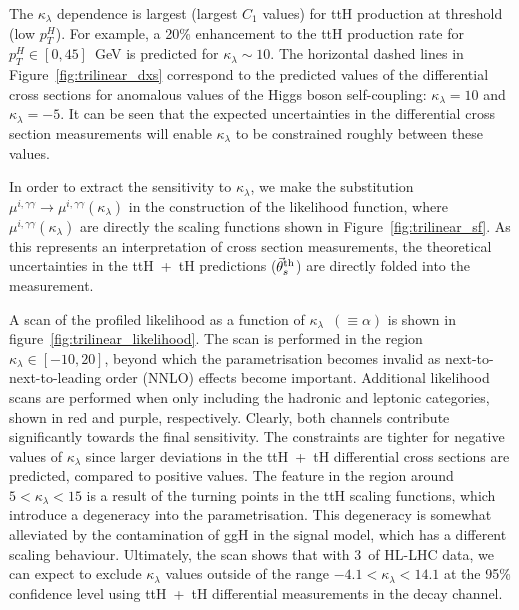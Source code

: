 The $\kappa_\lambda$ dependence is largest (largest $C_1$ values) for ttH production at threshold (low $p_T^H$). For example, a 20\% enhancement to the ttH production rate for $p_T^H\in[0,45]$~GeV is predicted for $\kappa_\lambda \sim 10$. The horizontal dashed lines in Figure~\ref{fig:trilinear_dxs} correspond to the predicted values of the differential cross sections for anomalous values of the Higgs boson self-coupling: $\kappa_\lambda=10$ and $\kappa_\lambda=-5$. It can be seen that the expected uncertainties in the differential cross section measurements will enable $\kappa_\lambda$ to be constrained roughly between these values.

In order to extract the sensitivity to $\kappa_\lambda$, we make the substitution $\mu^{i,\gamma\gamma}\rightarrow\mu^{i,\gamma\gamma}(\kappa_\lambda)$ in the construction of the likelihood function, where $\mu^{i,\gamma\gamma}(\kappa_\lambda)$ are directly the scaling functions shown in Figure~\ref{fig:trilinear_sf}. As this represents an interpretation of cross section measurements, the theoretical uncertainties in the ttH~+~tH predictions ($\vec{\theta}^{\rm{th}}_s$) are directly folded into the measurement.

A scan of the profiled likelihood as a function of $\kappa_\lambda$~$(\equiv\alpha)$ is shown in figure~\ref{fig:trilinear_likelihood}. The scan is performed in the region $\kappa_\lambda \in [-10,20]$, beyond which the parametrisation becomes invalid as next-to-next-to-leading order (NNLO) effects become important. Additional likelihood scans are performed when only including the hadronic and leptonic categories, shown in red and purple, respectively. Clearly, both channels contribute significantly towards the final sensitivity. The constraints are tighter for negative values of $\kappa_\lambda$ since larger deviations in the ttH~+~tH differential cross sections are predicted, compared to positive values. The feature in the region around $5<\kappa_\lambda<15$ is a result of the turning points in the ttH scaling functions, which introduce a degeneracy into the parametrisation. This degeneracy is somewhat alleviated by the contamination of ggH in the signal model, which has a different scaling behaviour. Ultimately, the scan shows that with 3~\abinv of HL-LHC data, we can expect to exclude $\kappa_\lambda$ values outside of the range $-4.1<\kappa_\lambda<14.1$ at the 95\% confidence level using ttH~+~tH differential measurements in the \Hgg decay channel.

